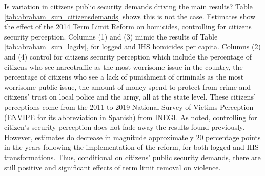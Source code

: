 \documentclass[12pt]{amsart}
\numberwithin{equation}{section}
\theoremstyle{definition}
\theoremstyle{definition}
\theoremstyle{definition}
\begin{document}

 



 

Is variation in citizens public security demands driving the main results? Table \ref{tab:abraham_sun_citizensdemands} shows this is not the case. Estimates show the effect of the 2014 Term Limit Reform on homicides, controlling for citizens security perception. Columns (1) and (3) mimic the results of Table \ref{tab:abraham_sun_lagdv}, for logged and IHS homicides per capita. Columns (2) and (4) control for citizens security perception which include the percentage of citizens who see narcotraffic as the most worrisome issue in the country, the percentage of citizens who see a lack of punishment of criminals as the most worrisome public issue, the amount of money spend to protect from crime and citizens' trust on local police and the army, all at the state level. These citizens' perceptions come from the 2011 to 2019 National Survey of Victims Perception (ENVIPE for its abbreviation in Spanish) from INEGI. As noted, controlling for citizen's security perception does not fade away the results found previously. However, estimates do decrease in magnitude approximately 20 percentage points in the years following the implementation of the reform, for both logged and IHS transformations. Thus, conditional on citizens' public security demands, there are still positive and significant effects of term limit removal on violence.
      
\end{document}
